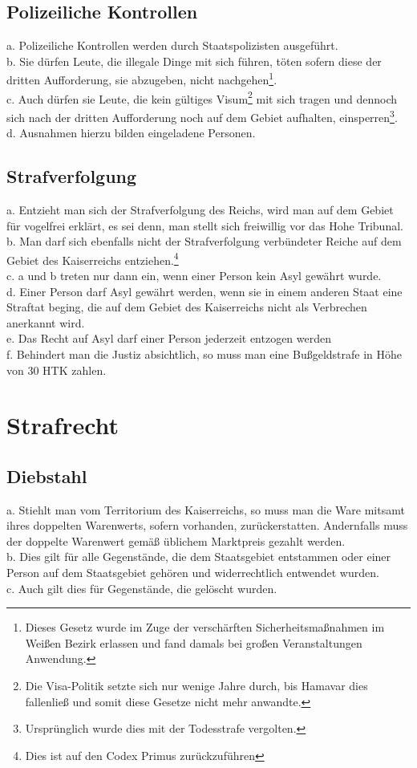 \documentclass{article}
\begin{document}
\subsection{Polizeiliche Kontrollen}
a. Polizeiliche Kontrollen werden durch Staatspolizisten ausgeführt.\\
b. Sie dürfen Leute, die illegale Dinge mit sich führen, töten sofern diese der dritten Aufforderung, sie abzugeben, nicht nachgehen\footnote{Dieses Gesetz wurde im Zuge der verschärften Sicherheitsmaßnahmen im Weißen Bezirk erlassen und fand damals bei großen Veranstaltungen Anwendung.}.\\
c. Auch dürfen sie Leute, die kein gültiges Visum\footnote{Die Visa-Politik setzte sich nur wenige Jahre durch, bis Hamavar dies fallenließ und somit diese Gesetze nicht mehr anwandte.} mit sich tragen und dennoch sich nach der dritten Aufforderung noch auf dem Gebiet aufhalten, einsperren\footnote{Ursprünglich wurde dies mit der Todesstrafe vergolten.}.\\
d. Ausnahmen hierzu bilden eingeladene Personen.

\subsection{Strafverfolgung}
a. Entzieht man sich der Strafverfolgung des Reichs, wird man auf dem Gebiet für vogelfrei erklärt, es sei denn, man stellt sich freiwillig vor das Hohe Tribunal.\\
b. Man darf sich ebenfalls nicht der Strafverfolgung verbündeter Reiche auf dem Gebiet des Kaiserreichs entziehen.\footnote{Dies ist auf den Codex Primus zurückzuführen}\\
c. a und b treten nur dann ein, wenn einer Person kein Asyl gewährt wurde.\\
d. Einer Person darf Asyl gewährt werden, wenn sie in einem anderen Staat eine Straftat beging, die auf dem Gebiet des Kaiserreichs nicht als Verbrechen anerkannt wird.\\
e. Das Recht auf Asyl darf einer Person jederzeit entzogen werden\\
f. Behindert man die Justiz absichtlich, so muss man eine Bußgeldstrafe in Höhe von 30 HTK zahlen. 

\section{Strafrecht}
\subsection{Diebstahl}
a. Stiehlt man vom Territorium des Kaiserreichs, so muss man die Ware mitsamt ihres doppelten Warenwerts, sofern vorhanden, zurückerstatten. Andernfalls muss der doppelte Warenwert gemäß üblichem Marktpreis gezahlt werden.\\
b. Dies gilt für alle Gegenstände, die dem Staatsgebiet entstammen oder einer Person auf dem Staatsgebiet gehören und widerrechtlich entwendet wurden.\\
c. Auch gilt dies für Gegenstände, die gelöscht wurden.
\end{document}
